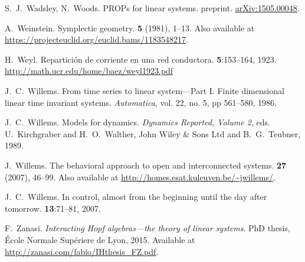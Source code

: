\begin{thebibliography}{RSW00}

     S.\ J.\ Wadsley, N.\ Woods. 
    \newblock PROPs for linear systems.
    \newblock preprint. 
    \newblock \href{http://arxiv.org/abs/1505.00048}{arXiv:1505.00048}.

    A.\ Weinstein.
    \newblock Symplectic geometry.
     {\bf 5} (1981), 1--13.
    \newblock Also available at 	
    \href{https://projecteuclid.org/euclid.bams/1183548217}
    {https://projecteuclid.org/euclid.bams/1183548217}.

    H.\ Weyl.
    \newblock Repartici\'on de corriente en una red conductora.
     {\bf 5}:153--164, 1923.
    \newblock \href{http://math.ucr.edu/home/baez/weyl1923.pdf}{http://math.ucr.edu/home/baez/weyl1923.pdf}

    J.\ C.\ Willems.
    \newblock From time series to linear system---Part I.
    Finite dimensional linear time invariant systems.
    \newblock \emph{Automatica}, vol.  22, no. 5, pp 561--580, 1986. 

    J.\ C.\ Willems.
    \newblock Models for dynamics.
    \newblock \emph{Dynamics Reported,
    Volume 2}, eds. U.\ Kirchgraber and H.\ O.\ Walther, John Wiley \& Sons
    Ltd and B.\ G.\ Teubner, 1989.

    J.\ Willems.
    \newblock The behavioral approach to open and interconnected
    systems.
     {\bf 27} (2007), 46--99.
    \newblock Also available at
    \href{http://homes.esat.kuleuven.be/~jwillems/}  
    {http://homes.esat.kuleuven.be/\~{}jwillems/}.

    J.\ C.\ Willems.
    \newblock In control, almost from the beginning until the day
    after tomorrow.
     {\bf 13}:71--81, 2007. 

     F.\ Zanasi. 
    \newblock \emph{Interacting Hopf algebras---the theory of linear
    systems}. 
    \newblock PhD thesis, \'Ecole Normale Sup\'eriere de Lyon, 2015. 
    \newblock Available
    at \href{http://zanasi.com/fabio/IHthesis_FZ.pdf}
    {http://zanasi.com/fabio/IHthesis\_FZ.pdf}.

\end{thebibliography}


